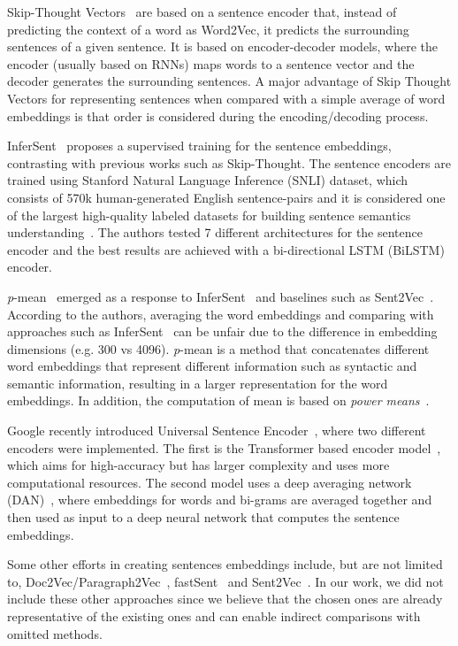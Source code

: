 \documentclass{article}
\begin{document}
Skip-Thought Vectors~\cite{kiros2015skip} are based on a sentence encoder that, instead of predicting the context of a word as Word2Vec, it predicts the surrounding sentences of a given sentence. It is based on encoder-decoder models, where the encoder (usually based on RNNs) maps words to a sentence vector and the decoder generates the surrounding sentences. A major advantage of Skip Thought Vectors for representing sentences when compared with a simple average of word embeddings is that order is considered during the encoding/decoding process.

InferSent~\cite{conneau2017supervised} proposes a supervised training for the sentence embeddings, contrasting with previous works such as Skip-Thought. The sentence encoders are trained using Stanford Natural Language Inference (SNLI) dataset, which consists of 570k human-generated English sentence-pairs and it is considered one of the largest high-quality labeled datasets for building sentence semantics understanding~\cite{bowman2015large}. The authors tested 7 different architectures for the sentence encoder and the best results are achieved with a bi-directional LSTM (BiLSTM) encoder.

\textit{p}-mean~\cite{DBLP:journals/corr/abs-1803-01400} emerged as a response to InferSent~\cite{conneau2017supervised} and baselines such as Sent2Vec~\cite{pagliardini2017unsupervised}. According to the authors, averaging the word embeddings and comparing with approaches such as InferSent~\cite{conneau2017supervised} can be unfair due to the difference in embedding dimensions (e.g. 300 vs 4096). \textit{p}-mean is a method that concatenates different word embeddings that represent different information such as syntactic and semantic information, resulting in a larger representation for the word embeddings. In addition, the computation of mean is based on \textit{power means}~\cite{hardy1952inequalities}.

Google recently introduced Universal Sentence Encoder~\cite{DBLP:journals/corr/abs-1803-11175}, where two different encoders were implemented. The first is the Transformer based encoder model~\cite{vaswani2017attention}, which aims for high-accuracy but has larger complexity and uses more computational resources. The second model uses a deep averaging network (DAN)~\cite{iyyer2015deep}, where embeddings for words and bi-grams are averaged together and then used as input to a deep neural network that computes the sentence embeddings.

Some other efforts in creating sentences embeddings include, but are not limited to, Doc2Vec/Paragraph2Vec~\cite{le2014distributed}, fastSent~\cite{hill2016learning} and Sent2Vec~\cite{pagliardini2017unsupervised}. In our work, we did not include these other approaches since we believe that the chosen ones are already representative of the existing ones and can enable indirect comparisons with omitted methods.
\end{document}
